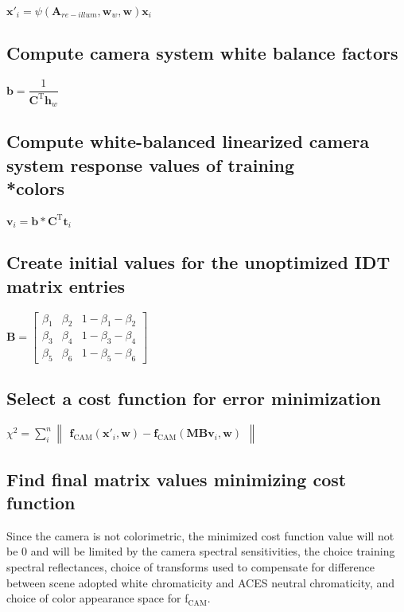 $\mathbf{x}'_i = \psi(\mathbf{A}_{re-illum},\mathbf{w}_w,\mathbf{w})\mathbf{x}_i$

\subsection{Compute camera system white balance factors}
$\mathbf{b}=\dfrac{1}{\mathbf{C}^\mathrm{T}\mathbf{h}_w}$

\subsection{Compute white-balanced linearized camera system response values of training \\*colors}
$\mathbf{v}_i=\mathbf{b}*\mathbf{C}^\mathrm{T}\mathbf{t}_i$

\subsection{Create initial values for the unoptimized IDT matrix entries}
$   \mathbf{B} =
    \begin{bmatrix}
		\beta_1 & \beta_2 & 1-\beta_1-\beta_2 \\
		\beta_3 & \beta_4 & 1-\beta_3-\beta_4 \\
		\beta_5 & \beta_6 & 1-\beta_5-\beta_6
    \end{bmatrix}$

\subsection{Select a cost function for error minimization}
$\chi^2=\displaystyle\sum_{i}^{n}\begin{Vmatrix}\mathbf{f}_{\mathrm{CAM}}(\mathbf{x}'_i,\mathbf{w})-\mathbf{f}_{\mathrm{CAM}}(\mathbf{MBv}_i,\mathbf{w})\end{Vmatrix}$

\subsection{Find final matrix values minimizing cost function}
Since the camera is not colorimetric, the minimized cost function value will not be 0 and will be limited by the camera spectral sensitivities, the choice training spectral reflectances, choice of transforms used to compensate for difference between scene adopted white chromaticity and ACES neutral chromaticity, and choice of color appearance space for f$_\mathrm{CAM}$.
